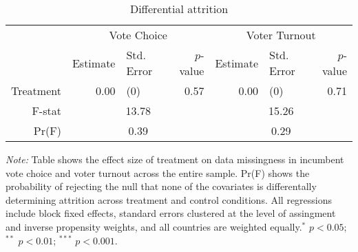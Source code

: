 \begin{table}[h!]
\caption{Differential attrition}
\centering
\begin{tabular}{rrlrrlr}
  \hline& \multicolumn{3}{c}{Vote Choice}&\multicolumn{3}{c}{Voter Turnout} \\
 & Estimate & Std. Error & $p$-value & Estimate & Std. Error & $p$-value \\ 
  \hline
Treatment & 0.00 & (0) & 0.57 & 0.00 & (0) & 0.71 \\ 
   \hline
F-stat & \multicolumn{3}{c}{13.78}&\multicolumn{3}{c}{15.26} \\
Pr(F) & \multicolumn{3}{c}{0.39}&\multicolumn{3}{c}{0.29} \\ \hline \hline
\end{tabular}
\begin{flushleft}\textit{Note:} Table shows the effect size of treatment on data missingness in incumbent vote choice and voter turnout across the entire sample. Pr(F) shows the probability of rejecting the null that none of the covariates is differentally determining attrition across treatment and control conditions. All regressions include block fixed effects, standard errors clustered at the level of assingment and inverse propensity weights, and all countries are weighted equally.$^*$ $p<0.05$; $^{**}$ $p<0.01$; $^{***}$ $p<0.001$. \end{flushleft}
\end{table}
